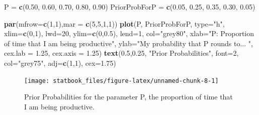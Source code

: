 \documentclass[]{book}
\newenvironment{Shaded}{\begin{snugshade}}{\end{snugshade}}
\newcommand{\DataTypeTok}[1]{\textcolor[rgb]{0.13,0.29,0.53}{#1}}
\newcommand{\DecValTok}[1]{\textcolor[rgb]{0.00,0.00,0.81}{#1}}
\newcommand{\FloatTok}[1]{\textcolor[rgb]{0.00,0.00,0.81}{#1}}
\newcommand{\KeywordTok}[1]{\textcolor[rgb]{0.13,0.29,0.53}{\textbf{#1}}}
\newcommand{\NormalTok}[1]{#1}
\newcommand{\StringTok}[1]{\textcolor[rgb]{0.31,0.60,0.02}{#1}}
\begin{document}
\begin{Shaded}
\begin{Highlighting}[]
\NormalTok{P =}\StringTok{ }\KeywordTok{c}\NormalTok{(}\FloatTok{0.50}\NormalTok{, }\FloatTok{0.60}\NormalTok{, }\FloatTok{0.70}\NormalTok{, }\FloatTok{0.80}\NormalTok{, }\FloatTok{0.90}\NormalTok{)}
\NormalTok{PriorProbForP =}\StringTok{ }\KeywordTok{c}\NormalTok{(}\FloatTok{0.05}\NormalTok{, }\FloatTok{0.25}\NormalTok{, }\FloatTok{0.35}\NormalTok{, }\FloatTok{0.30}\NormalTok{, }\FloatTok{0.05}\NormalTok{)}

\KeywordTok{par}\NormalTok{(}\DataTypeTok{mfrow=}\KeywordTok{c}\NormalTok{(}\DecValTok{1}\NormalTok{,}\DecValTok{1}\NormalTok{),}\DataTypeTok{mar =} \KeywordTok{c}\NormalTok{(}\DecValTok{5}\NormalTok{,}\DecValTok{5}\NormalTok{,}\DecValTok{1}\NormalTok{,}\DecValTok{1}\NormalTok{))}
\KeywordTok{plot}\NormalTok{(P, PriorProbForP, }\DataTypeTok{type=}\StringTok{"h"}\NormalTok{, }\DataTypeTok{xlim=}\KeywordTok{c}\NormalTok{(}\DecValTok{0}\NormalTok{,}\DecValTok{1}\NormalTok{),}
     \DataTypeTok{lwd=}\DecValTok{20}\NormalTok{, }\DataTypeTok{ylim=}\KeywordTok{c}\NormalTok{(}\DecValTok{0}\NormalTok{,}\FloatTok{0.5}\NormalTok{),  }\DataTypeTok{lend=}\DecValTok{1}\NormalTok{, }\DataTypeTok{col=}\StringTok{"grey80"}\NormalTok{,}
     \DataTypeTok{xlab=}\StringTok{"P: Proportion of time that I am being productive"}\NormalTok{,}
     \DataTypeTok{ylab=}\StringTok{"My probability that P rounds to... "}\NormalTok{,}
     \DataTypeTok{cex.lab =} \FloatTok{1.25}\NormalTok{, }\DataTypeTok{cex.axis =} \FloatTok{1.25}\NormalTok{)}
\KeywordTok{text}\NormalTok{(}\FloatTok{0.5}\NormalTok{,}\FloatTok{0.25}\NormalTok{, }\StringTok{"Prior Probabilities"}\NormalTok{, }\DataTypeTok{font=}\DecValTok{2}\NormalTok{,}
     \DataTypeTok{col=}\StringTok{"grey75"}\NormalTok{, }\DataTypeTok{adj=}\KeywordTok{c}\NormalTok{(}\DecValTok{1}\NormalTok{,}\DecValTok{1}\NormalTok{), }\DataTypeTok{cex=}\FloatTok{1.75}\NormalTok{)}
\end{Highlighting}
\end{Shaded}

\begin{figure}

{\centering \texttt{[image: statbook\_files/figure-latex/unnamed-chunk-8-1]} 

}

\caption{Prior Probabilities for the parameter P, the proportion of time that I am being productive.}\label{fig:unnamed-chunk-8}
\end{figure}
\end{document}
